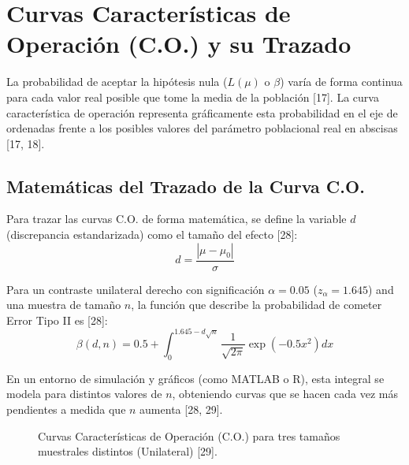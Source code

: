 \documentclass{article}
\begin{document}
\section{Curvas Características de Operación (C.O.) y su Trazado}

La probabilidad de aceptar la hipótesis nula ($L(\mu)$ o $\beta$) varía de forma continua para cada valor real posible que tome la media de la población [17]. La curva característica de operación representa gráficamente esta probabilidad en el eje de ordenadas frente a los posibles valores del parámetro poblacional real en abscisas [17, 18].

\subsection{Matemáticas del Trazado de la Curva C.O.}

Para trazar las curvas C.O. de forma matemática, se define la variable $d$ (discrepancia estandarizada) como el tamaño del efecto [28]:
\[
d = \frac{|\mu - \mu_0|}{\sigma}
\]

Para un contraste unilateral derecho con significación $\alpha = 0.05$ ($z_\alpha = 1.645$) and una muestra de tamaño $n$, la función que describe la probabilidad de cometer Error Tipo II es [28]:
\[
\beta(d, n) = 0.5 + \int_{0}^{1.645 - d\sqrt{n}} \frac{1}{\sqrt{2\pi}} \exp(-0.5x^2) dx
\]

En un entorno de simulación y gráficos (como MATLAB o R), esta integral se modela para distintos valores de $n$, obteniendo curvas que se hacen cada vez más pendientes a medida que $n$ aumenta [28, 29].

\begin{figure}[h!]
\centering
{}
\caption{Curvas Características de Operación (C.O.) para tres tamaños muestrales distintos (Unilateral) [29].}
\end{figure}
\end{document}
